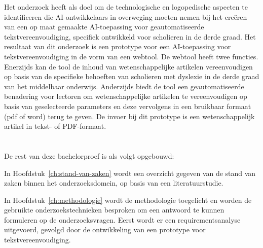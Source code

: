 Het onderzoek heeft als doel om de technologische en logopedische aspecten te identificeren die AI-ontwikkelaars in overweging moeten nemen bij het creëren van een op maat gemaakte AI-toepassing voor geautomatiseerde tekstvereenvoudiging, specifiek ontwikkeld voor scholieren in de derde graad. Het resultaat van dit onderzoek is een prototype voor een AI-toepassing voor tekstvereenvoudiging in de vorm van een webtool. De webtool heeft twee functies. Enerzijds kan de tool de inhoud van wetenschappelijke artikelen vereenvoudigen op basis van de specifieke behoeften van scholieren met dyslexie in de derde graad van het middelbaar onderwijs. Anderzijds biedt de tool een geautomatiseerde benadering voor lectoren om wetenschappelijke artikelen te vereenvoudigen op basis van geselecteerde parameters en deze vervolgens in een bruikbaar formaat (pdf of word) terug te geven. De invoer bij dit prototype is een wetenschappelijk artikel in tekst- of PDF-formaat.


\section{}%
\label{sec:opzet-bachelorproef}

De rest van deze bachelorproef is als volgt opgebouwd:

In Hoofdstuk~\ref{ch:stand-van-zaken} wordt een overzicht gegeven van de stand van zaken binnen het onderzoeksdomein, op basis van een literatuurstudie.

In Hoofdstuk~\ref{ch:methodologie} wordt de methodologie toegelicht en worden de gebruikte onderzoekstechnieken besproken om een antwoord te kunnen formuleren op de onderzoeksvragen. Eerst wordt er een requirementsanalyse uitgevoerd, gevolgd door de ontwikkeling van een prototype voor tekstvereenvoudiging.

